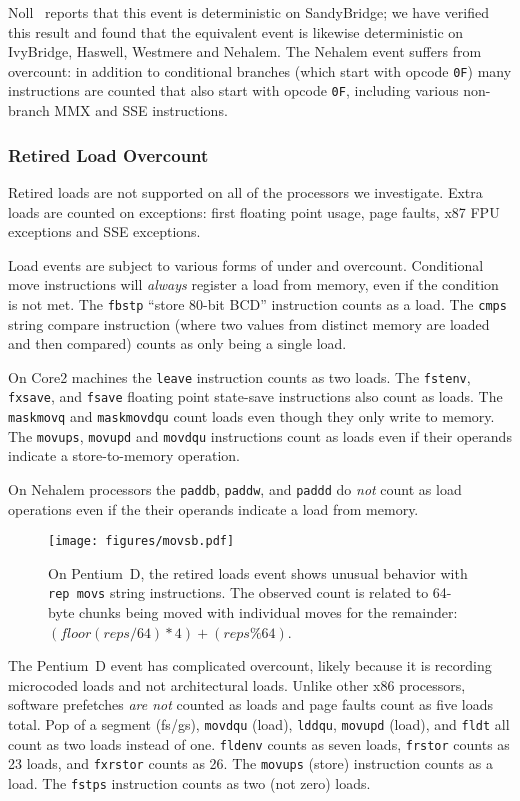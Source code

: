 Noll~\cite{noll:pc2011} reports that this event
is deterministic on SandyBridge; we have verified
this result and found that the equivalent event
is likewise deterministic on IvyBridge, Haswell, Westmere and Nehalem.
The Nehalem event suffers from overcount:
in addition to conditional branches (which start with opcode {\tt 0F})
many instructions are counted that also start with opcode {\tt 0F},
including various non-branch MMX and SSE instructions.

\subsubsection{Retired Load Overcount} 
Retired loads are not supported on all of the processors we investigate.
Extra loads are counted on exceptions: first floating point usage,
page faults, x87 FPU exceptions and SSE exceptions.

Load events are subject to various forms of under and overcount.
Conditional move instructions will {\em always} register a 
load from memory, even if the condition is not met.
The {\tt fbstp} ``store 80-bit BCD'' instruction counts as
a load.  The {\tt cmps} string compare instruction (where two values from 
distinct memory are loaded and then compared) counts as only being
a single load.

On Core2 machines the {\tt leave} instruction counts as two loads.
The {\tt fstenv}, {\tt fxsave},  and {\tt fsave} floating point
state-save instructions also count as loads.
The  {\tt maskmovq} and  {\tt maskmovdqu} count loads even though
they only write to memory.  The {\tt movups}, {\tt movupd} and 
{\tt movdqu} instructions count as loads even if their operands
indicate a store-to-memory operation.

On Nehalem processors the {\tt paddb}, {\tt paddw}, and {\tt paddd}
do {\em not} count as load operations even if the their operands
indicate a load from memory.

\begin{figure}[!t]
\centering
\texttt{[image: figures/movsb.pdf]}
\caption{On Pentium~D, the retired loads event shows unusual
       behavior with {\tt rep movs} string instructions.
       The observed count is related to 64-byte chunks being moved
       with individual moves for the remainder:
        $(floor(reps/64)*4)+(reps\%64)$.}
\label{figure:movsb}
\end{figure}

The Pentium~D event has complicated overcount, likely because
it is recording microcoded loads and not architectural loads.
Unlike other x86 processors, software
prefetches {\em are not} counted as loads and page faults 
count as five loads total.
Pop of a segment (fs/gs), {\tt movdqu} (load),
{\tt lddqu}, {\tt movupd} (load), and {\tt fldt} all count
as two loads instead of one. {\tt fldenv} counts as seven loads,
{\tt frstor} counts as 23 loads, and {\tt fxrstor} counts as 26.
The {\tt movups} (store) instruction counts as a load.
The {\tt fstps} instruction  counts as two (not zero) loads.

